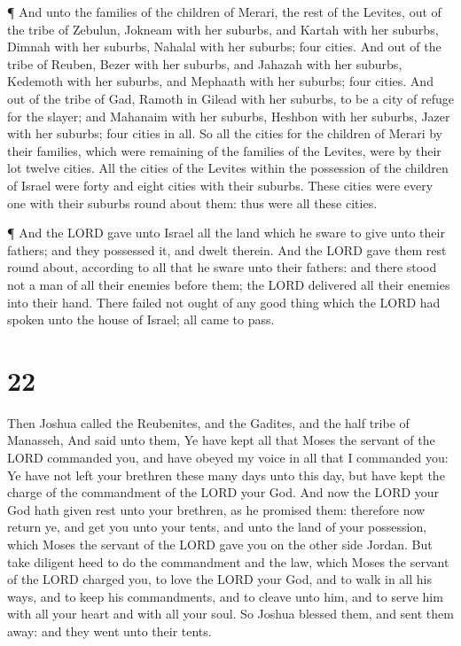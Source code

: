  ¶ And unto the families of the children of Merari, the
rest of the Levites, out of the tribe of Zebulun, Jokneam with her
suburbs, and Kartah with her suburbs,  Dimnah with her
suburbs, Nahalal with her suburbs; four cities.  And out of
the tribe of Reuben, Bezer with her suburbs, and Jahazah with her
suburbs,  Kedemoth with her suburbs, and Mephaath with her
suburbs; four cities.  And out of the tribe of Gad, Ramoth
in Gilead with her suburbs, to be a city of refuge for the slayer; and
Mahanaim with her suburbs,  Heshbon with her suburbs, Jazer
with her suburbs; four cities in all.  So all the cities
for the children of Merari by their families, which were remaining of
the families of the Levites, were by their lot twelve cities.
 All the cities of the Levites within the possession of the
children of Israel were forty and eight cities with their suburbs.
 These cities were every one with their suburbs round about
them: thus were all these cities.

 ¶ And the LORD gave unto Israel all the land which he
sware to give unto their fathers; and they possessed it, and dwelt
therein.  And the LORD gave them rest round about,
according to all that he sware unto their fathers: and there stood not a
man of all their enemies before them; the LORD delivered all their
enemies into their hand.  There failed not ought of any
good thing which the LORD had spoken unto the house of Israel; all came
to pass.

\hypertarget{section-21}{%
\section{22}\label{section-21}}

 Then Joshua called the Reubenites, and the Gadites, and the
half tribe of Manasseh,  And said unto them, Ye have kept
all that Moses the servant of the LORD commanded you, and have obeyed my
voice in all that I commanded you:  Ye have not left your
brethren these many days unto this day, but have kept the charge of the
commandment of the LORD your God.  And now the LORD your God
hath given rest unto your brethren, as he promised them: therefore now
return ye, and get you unto your tents, and unto the land of your
possession, which Moses the servant of the LORD gave you on the other
side Jordan.  But take diligent heed to do the commandment
and the law, which Moses the servant of the LORD charged you, to love
the LORD your God, and to walk in all his ways, and to keep his
commandments, and to cleave unto him, and to serve him with all your
heart and with all your soul.  So Joshua blessed them, and
sent them away: and they went unto their tents.

